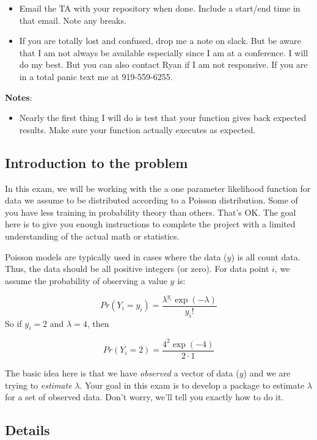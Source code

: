 \documentclass[
]{article}
\providecommand{\tightlist}{%
  \setlength{\itemsep}{0pt}\setlength{\parskip}{0pt}}
\begin{document}
\begin{itemize}
\item
  Email the TA with your repository when done. Include a start/end time
  in that email. Note any breaks.
\item
  If you are totally lost and confused, drop me a note on slack. But be
  aware that I am not always be available especially since I am at a
  conference. I will do my best. But you can also contact Ryan if I am
  not responsive. If you are in a total panic text me at 919-559-6255.
\end{itemize}

\textbf{Notes}:

\begin{itemize}
\tightlist
\item
  Nearly the first thing I will do is test that your function gives back
  expected results. Make sure your function actually executes as
  expected.
\end{itemize}

\hypertarget{introduction-to-the-problem}{%
\subsection{Introduction to the
problem}\label{introduction-to-the-problem}}

In this exam, we will be working with the a one parameter likelihood
function for data we assume to be distributed according to a Poisson
distribution. Some of you have less training in probability theory than
others. That's OK. The goal here is to give you enough instructions to
complete the project with a limited understanding of the actual math or
statistics.

Poisson models are typically used in cases where the data (\(y\)) is all
count data. Thus, the data should be all positive integers (or zero).
For data point \(i\), we assume the probability of observing a value
\(y\) is:

\[Pr(Y_i=y_i) = \frac{\lambda^{y_i}\exp(-\lambda)}{y_i!} \] So if
\(y_i=2\) and \(\lambda=4\), then

\[Pr(Y_i=2) = \frac{4^{2}\exp(-4)}{2\cdot1} \]

The basic idea here is that we have \emph{observed} a vector of data
(\(y\)) and we are trying to \emph{estimate} \(\lambda\). Your goal in
this exam is to develop a package to estimate \(\lambda\) for a set of
observed data. Don't worry, we'll tell you exactly how to do it.

\hypertarget{details}{%
\subsection{Details}\label{details}}
\end{document}
